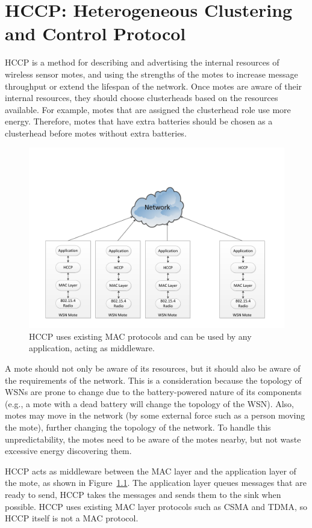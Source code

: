 \chapter{HCCP: Heterogeneous Clustering and Control Protocol}
\label{ch:HCCP_intro}

HCCP 
is a method for describing and advertising  the internal resources of wireless 
sensor motes, and using the strengths of the motes to increase message throughput
or extend the lifespan of 
the network. Once motes are aware of their internal resources, they should 
choose clusterheads based on the resources available. For 
example, motes that are assigned the clusterhead role use more energy. 
Therefore, motes that have extra batteries should be chosen as a clusterhead 
before motes without extra batteries. 

\begin{figure}[t]
	\centering
		\includegraphics[width=\textwidth]{images/protocol/HCCPAsMiddleWare.pdf}
	\caption{HCCP uses existing MAC protocols and can be used by any application, acting as middleware.}
	\label{fig:images_protocol_HCCPAsMiddleWare}
\end{figure}

A mote should not only be aware of its resources, but it should also be aware 
of the requirements of the network. This is a consideration because the topology 
of WSNs are prone to change due to the battery-powered nature of its 
components (e.g., a mote with a dead battery will change the topology of the 
WSN).  Also, motes may move in the network (by some external force such as a 
person moving the mote), further changing the topology of the network.  To 
handle this unpredictability, the motes need to be aware of the motes nearby, 
but not waste excessive energy discovering them.  

HCCP acts as middleware between the MAC layer and the application layer of the 
mote, as shown in Figure~\ref{fig:images_protocol_HCCPAsMiddleWare}. 
The application layer queues messages that are ready to send, HCCP takes the
messages and sends them to the sink when possible. HCCP uses existing MAC layer protocols 
such as CSMA and TDMA, so HCCP itself is not a MAC protocol.

